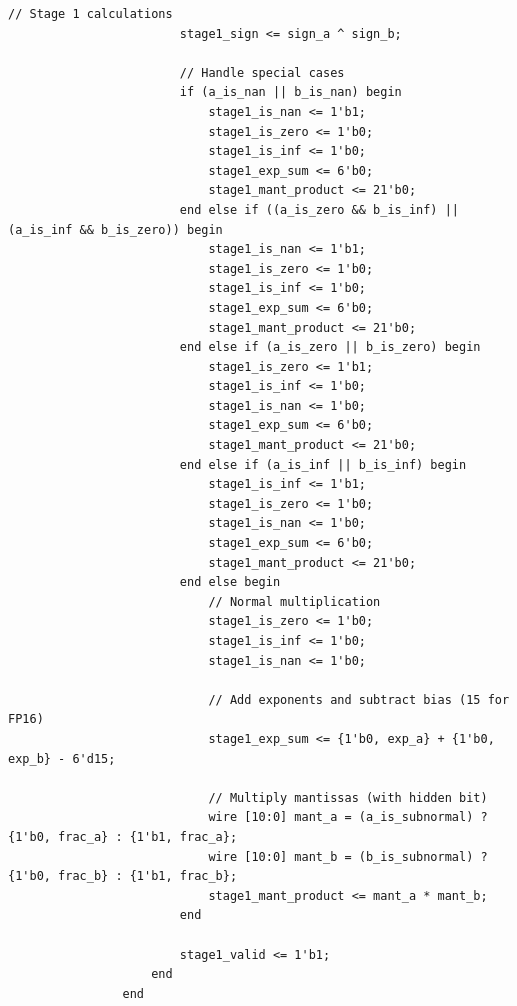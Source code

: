 \documentclass[UTF8]{ctexart}
\begin{document}
\begin{lstlisting}[frame=shadowbox,caption=fp\_multiplier\_generated.v]
                        // Stage 1 calculations
                        stage1_sign <= sign_a ^ sign_b;
                        
                        // Handle special cases
                        if (a_is_nan || b_is_nan) begin
                            stage1_is_nan <= 1'b1;
                            stage1_is_zero <= 1'b0;
                            stage1_is_inf <= 1'b0;
                            stage1_exp_sum <= 6'b0;
                            stage1_mant_product <= 21'b0;
                        end else if ((a_is_zero && b_is_inf) || (a_is_inf && b_is_zero)) begin
                            stage1_is_nan <= 1'b1;
                            stage1_is_zero <= 1'b0;
                            stage1_is_inf <= 1'b0;
                            stage1_exp_sum <= 6'b0;
                            stage1_mant_product <= 21'b0;
                        end else if (a_is_zero || b_is_zero) begin
                            stage1_is_zero <= 1'b1;
                            stage1_is_inf <= 1'b0;
                            stage1_is_nan <= 1'b0;
                            stage1_exp_sum <= 6'b0;
                            stage1_mant_product <= 21'b0;
                        end else if (a_is_inf || b_is_inf) begin
                            stage1_is_inf <= 1'b1;
                            stage1_is_zero <= 1'b0;
                            stage1_is_nan <= 1'b0;
                            stage1_exp_sum <= 6'b0;
                            stage1_mant_product <= 21'b0;
                        end else begin
                            // Normal multiplication
                            stage1_is_zero <= 1'b0;
                            stage1_is_inf <= 1'b0;
                            stage1_is_nan <= 1'b0;
                            
                            // Add exponents and subtract bias (15 for FP16)
                            stage1_exp_sum <= {1'b0, exp_a} + {1'b0, exp_b} - 6'd15;
                            
                            // Multiply mantissas (with hidden bit)
                            wire [10:0] mant_a = (a_is_subnormal) ? {1'b0, frac_a} : {1'b1, frac_a};
                            wire [10:0] mant_b = (b_is_subnormal) ? {1'b0, frac_b} : {1'b1, frac_b};
                            stage1_mant_product <= mant_a * mant_b;
                        end
                        
                        stage1_valid <= 1'b1;
                    end
                end
                

\end{lstlisting}
\end{document}
